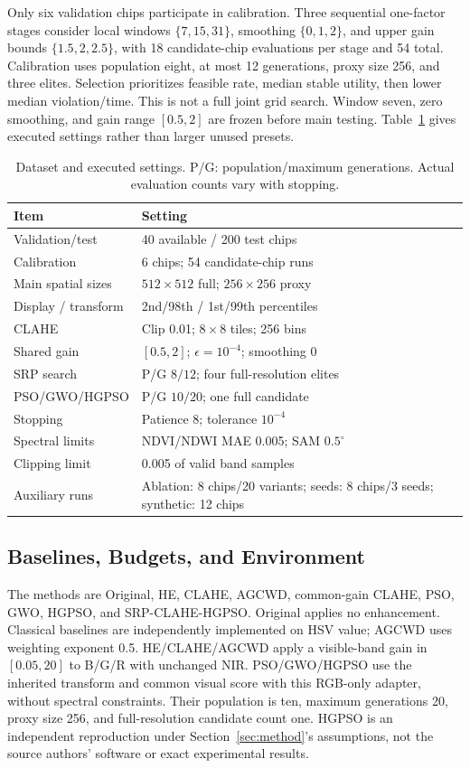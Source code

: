 \documentclass[conference]{IEEEtran}
\newcommand{\srp}{SRP-CLAHE-HGPSO}
\begin{document}
Only six validation chips participate in calibration. Three sequential one-factor stages consider local windows $\{7,15,31\}$, smoothing $\{0,1,2\}$, and upper gain bounds $\{1.5,2,2.5\}$, with 18 candidate-chip evaluations per stage and 54 total. Calibration uses population eight, at most 12 generations, proxy size 256, and three elites. Selection prioritizes feasible rate, median stable utility, then lower median violation/time. This is not a full joint grid search. Window seven, zero smoothing, and gain range $[0.5,2]$ are frozen before main testing. Table~\ref{tab:settings} gives executed settings rather than larger unused presets.

\begin{table}[t]
\centering\footnotesize
\caption{Dataset and executed settings. P/G: population/maximum generations. Actual evaluation counts vary with stopping.}
\label{tab:settings}
\begin{tabular}{@{}lp{}@{}}\toprule
Item & Setting \\\midrule
Validation/test & 40 available / 200 test chips \\
Calibration & 6 chips; 54 candidate-chip runs \\
Main spatial sizes & $512\times512$ full; $256\times256$ proxy \\
Display / transform & 2nd/98th / 1st/99th percentiles \\
CLAHE & Clip 0.01; $8\times8$ tiles; 256 bins \\
Shared gain & $[0.5,2]$; $\epsilon=10^{-4}$; smoothing 0 \\
SRP search & P/G $8/12$; four full-resolution elites \\
PSO/GWO/HGPSO & P/G $10/20$; one full candidate \\
Stopping & Patience 8; tolerance $10^{-4}$ \\
Spectral limits & NDVI/NDWI MAE 0.005; SAM $0.5^\circ$ \\
Clipping limit & 0.005 of valid band samples \\
Auxiliary runs & Ablation: 8 chips/20 variants; seeds: 8 chips/3 seeds; synthetic: 12 chips \\
\bottomrule\end{tabular}
\end{table}

\subsection{Baselines, Budgets, and Environment}
The methods are Original, HE, CLAHE, AGCWD, common-gain CLAHE, PSO, GWO, HGPSO, and \srp. Original applies no enhancement. Classical baselines are independently implemented on HSV value; AGCWD uses weighting exponent 0.5. HE/CLAHE/AGCWD apply a visible-band gain in $[0.05,20]$ to B/G/R with unchanged NIR. PSO/GWO/HGPSO use the inherited transform and common visual score with this RGB-only adapter, without spectral constraints. Their population is ten, maximum generations 20, proxy size 256, and full-resolution candidate count one. HGPSO is an independent reproduction under Section~\ref{sec:method}'s assumptions, not the source authors' software or exact experimental results.
\end{document}
